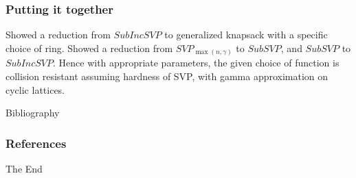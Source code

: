\documentclass{beamer}
\begin{document}
\begin{frame}
	\frametitle{Putting it together}
	Showed a reduction from $SubIncSVP$ to generalized knapsack with a specific choice of ring. Showed a reduction from $SVP_{\max(n,\gamma)}$ to $SubSVP$, and $SubSVP$ to $SubIncSVP$. Hence with appropriate parameters, the given choice of function is collision resistant assuming hardness of SVP, with gamma approximation on cyclic lattices.
\end{frame}

\begin{frame}{Bibliography}
\frametitle{References}
\footnotesize{


}
\end{frame}


\begin{frame}
\Huge{\centerline{The End}}
\end{frame}

\end{document}
